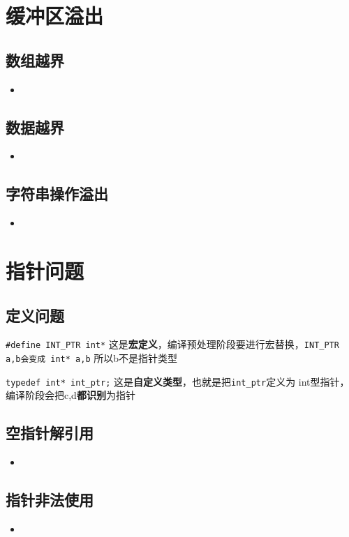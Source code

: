 \documentclass[UTF8,a4paper,12pt]{ctexbook} %
\begin{document}
\section{缓冲区溢出}
		\subsection{数组越界}
			\begin{itemize}
				\item 
			\end{itemize}
		\subsection{数据越界}
			\begin{itemize}
				\item 
			\end{itemize}
		\subsection{字符串操作溢出}
			\begin{itemize}
				\item 
			\end{itemize}

\section{指针问题}
		\subsection{定义问题}
			\verb|#define INT_PTR int*| 这是\textbf{宏定义}，编译预处理阶段要进行宏替换，\verb|INT_PTR a,b会变成 int* a,b| 所以b不是指针类型
			
			\verb|typedef int* int_ptr;| 这是\textbf{自定义类型}，也就是把\verb|int_ptr|定义为 int型指针，编译阶段会把c,d\textbf{都识别}为指针
			
		\subsection{空指针解引用}
			\begin{itemize}
				\item 
			\end{itemize}
		\subsection{指针非法使用}
			\begin{itemize}
				\item 
			\end{itemize}
			
\end{document}
